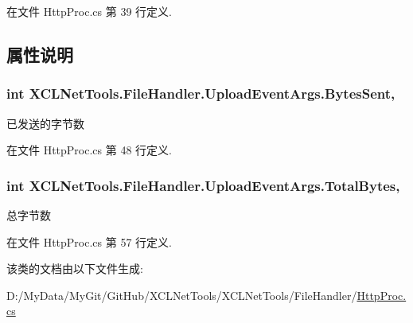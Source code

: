 在文件 Http\-Proc.\-cs 第 39 行定义.



\subsection{属性说明}
\hypertarget{class_x_c_l_net_tools_1_1_file_handler_1_1_upload_event_args_aeb753c87413d86d610121060635794e1}{
\subsubsection[{Bytes\-Sent}]{\setlength{\rightskip}{0pt plus 5cm}int X\-C\-L\-Net\-Tools.\-File\-Handler.\-Upload\-Event\-Args.\-Bytes\-Sent\hspace{0.3cm}{\ttfamily [get]}, {\ttfamily [set]}}}\label{class_x_c_l_net_tools_1_1_file_handler_1_1_upload_event_args_aeb753c87413d86d610121060635794e1}


已发送的字节数 



在文件 Http\-Proc.\-cs 第 48 行定义.

\hypertarget{class_x_c_l_net_tools_1_1_file_handler_1_1_upload_event_args_a874a8bc16016a3d11eb9aa52f9670eb4}{
\subsubsection[{Total\-Bytes}]{\setlength{\rightskip}{0pt plus 5cm}int X\-C\-L\-Net\-Tools.\-File\-Handler.\-Upload\-Event\-Args.\-Total\-Bytes\hspace{0.3cm}{\ttfamily [get]}, {\ttfamily [set]}}}\label{class_x_c_l_net_tools_1_1_file_handler_1_1_upload_event_args_a874a8bc16016a3d11eb9aa52f9670eb4}


总字节数 



在文件 Http\-Proc.\-cs 第 57 行定义.



该类的文档由以下文件生成\-:\begin{DoxyCompactItemize}
\item 
D\-:/\-My\-Data/\-My\-Git/\-Git\-Hub/\-X\-C\-L\-Net\-Tools/\-X\-C\-L\-Net\-Tools/\-File\-Handler/\hyperlink{_http_proc_8cs}{Http\-Proc.\-cs}\end{DoxyCompactItemize}
